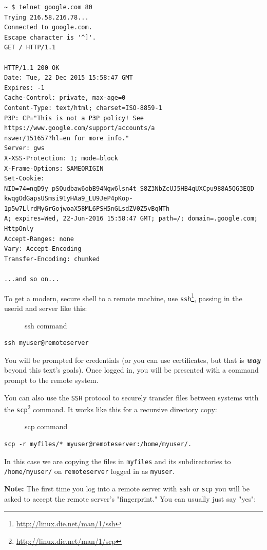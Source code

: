 \documentclass[10pt,]{book}
\renewcommand{\href}[2]{#2\footnote{\url{#1}}}
\numberwithin{figure}{chapter}
\DeclareRobustCommand{\drcap}[1]{\begin{figure}[H]\caption{#1}\end{figure}}
\DeclareRobustCommand{\drcmd}[1]{\index{Commands!#1}}
\begin{document}
\begin{verbatim}
~ $ telnet google.com 80
Trying 216.58.216.78...
Connected to google.com.
Escape character is '^]'.
GET / HTTP/1.1

HTTP/1.1 200 OK
Date: Tue, 22 Dec 2015 15:58:47 GMT
Expires: -1
Cache-Control: private, max-age=0
Content-Type: text/html; charset=ISO-8859-1
P3P: CP="This is not a P3P policy! See https://www.google.com/support/accounts/a
nswer/151657?hl=en for more info."
Server: gws
X-XSS-Protection: 1; mode=block
X-Frame-Options: SAMEORIGIN
Set-Cookie: NID=74=nqD9y_pSQudbaw6obB94Ngw6lsn4t_S8Z3NbZcUJ5HB4qUXCpu988A5QG3EQD
kwqgOdGapsUSmsi91yHAa9_LU9JeP4pKop-1p5w7LlrdMyGrGojwoaX58ML6PSH5nGLsdZV0Z5vBqNTh
A; expires=Wed, 22-Jun-2016 15:58:47 GMT; path=/; domain=.google.com; HttpOnly
Accept-Ranges: none
Vary: Accept-Encoding
Transfer-Encoding: chunked

...and so on...
\end{verbatim}

To get a modern, secure shell to a remote machine, use
\href{http://linux.die.net/man/1/ssh}{\texttt{ssh}}\drcmd{ssh}, passing
in the userid and server like this:

\drcap{ssh command}

\begin{verbatim}
ssh myuser@remoteserver
\end{verbatim}

You will be prompted for credentials (or you can use certificates, but
that is \textbf{\emph{way}} beyond this text's goals). Once logged in,
you will be presented with a command prompt to the remote system.

You can also use the \texttt{SSH} protocol to securely transfer files
between systems with the
\href{http://linux.die.net/man/1/scp}{\texttt{scp}}\drcmd{scp} command.
It works like this for a recursive directory copy:

\drcap{scp command}

\begin{verbatim}
scp -r myfiles/* myuser@remoteserver:/home/myuser/.
\end{verbatim}

In this case we are copying the files in \texttt{myfiles} and its
subdirectories to \texttt{/home/myuser/} on \texttt{remoteserver} logged
in as \texttt{myuser}.

\textbf{Note:} The first time you log into a remote server with
\texttt{ssh} or \texttt{scp} you will be asked to accept the remote
server's "fingerprint." You can usually just say "yes":
\end{document}
